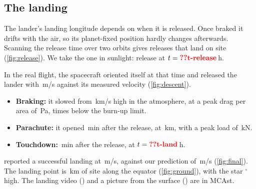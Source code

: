 \documentclass[aps,prd,twocolumn,nofootinbib,floatfix,superscriptaddress]{revtex4-2}
\begin{document}
\subsection{The landing}
The lander's landing longitude depends on when it is released.
Once braked it drifts with the air, so its planet-fixed position hardly changes afterwards.
Scanning the release time over two orbits gives  releases that land on site  (\cref{fig:release}).
We take the one in sunlight: release at $t=\val{t-release}$\,h.

In the real flight, the spacecraft oriented itself at that time and released the lander with \,m/s against its measured velocity (\cref{fig:descent}).
\begin{itemize}
\item \textbf{Braking:} it slowed from \,km/s high in the atmosphere, at a peak drag per area of \,Pa,  times below the burn-up limit.
\item \textbf{Parachute:} it opened \,min after the release, at \,km, with a peak load of \,kN.
\item \textbf{Touchdown:} \,min after the release, at $t=\val{t-land}$\,h.
\end{itemize}
 reported a successful landing at \,m/s, against our prediction of \,m/s (\cref{fig:final}).
The landing point is \,km  of site  along the equator (\cref{fig:ground}), with the star $^\circ$ high.
The landing video () and a picture from the surface () are in MCAst.


\end{document}
